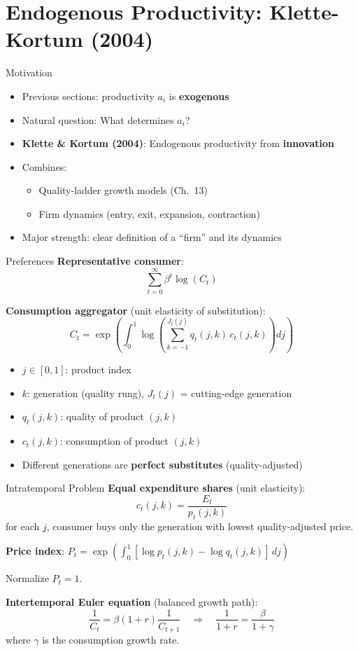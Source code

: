 \documentclass[blue]{beamer}
\begin{document}
\section{Endogenous Productivity: Klette-Kortum (2004)}

\begin{frame}{Motivation}
	\begin{itemize}
		\item Previous sections: productivity $a_i$ is \textbf{exogenous}
		\item Natural question: What determines $a_i$?
		\item \textbf{Klette \& Kortum (2004)}: Endogenous productivity from \textbf{innovation}
		\item Combines:
		\begin{itemize}
			\item Quality-ladder growth models (Ch.\ 13)
			\item Firm dynamics (entry, exit, expansion, contraction)
		\end{itemize}
		\item Major strength: clear definition of a ``firm'' and its dynamics
	\end{itemize}
\end{frame}

\begin{frame}{Preferences}
	\textbf{Representative consumer}:
	\[
	\sum_{t=0}^\infty \beta^t \log(C_t)
	\]
	
	\textbf{Consumption aggregator} (unit elasticity of substitution):
	\[
	C_t = \exp\left( \int_0^1 \log\left( \sum_{k=-1}^{J_t(j)} q_t(j,k) \, c_t(j,k) \right) dj \right)
	\]
	
	\begin{itemize}
		\item $j \in [0,1]$: product index
		\item $k$: generation (quality rung), $J_t(j)$ = cutting-edge generation
		\item $q_t(j,k)$: quality of product $(j,k)$
		\item $c_t(j,k)$: consumption of product $(j,k)$
		\item Different generations are \textbf{perfect substitutes} (quality-adjusted)
	\end{itemize}
\end{frame}

\begin{frame}{Intratemporal Problem}
	\textbf{Equal expenditure shares} (unit elasticity):
	\[
	c_t(j,k) = \frac{E_t}{p_t(j,k)}
	\]
	for each $j$, consumer buys only the generation with lowest quality-adjusted price.
	
	\bigskip
	\textbf{Price index}: $P_t = \exp\left( \int_0^1 [\log p_t(j,k) - \log q_t(j,k)] \, dj \right)$
	
	Normalize $P_t = 1$.
	
	\bigskip
	\textbf{Intertemporal Euler equation} (balanced growth path):
	\[
	\frac{1}{C_t}=\beta(1+r)\frac{1}{C_{t+1}}\quad\Rightarrow\quad \frac{1}{1+r} = \frac{\beta}{1+\gamma}
	\]
	where $\gamma$ is the consumption growth rate.
\end{frame}
\end{document}
